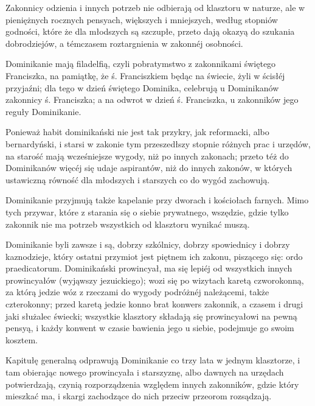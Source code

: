 \documentclass{book}
\begin{document}
Zakonnicy odzienia i innych potrzeb nie odbierają od klasztoru w naturze, ale w pieniężnych rocznych pensyach, większych i mniejszych, według stopniów godności, które że dla młodszych są szczupłe, przeto dają okazyą do szukania dobrodziejów, a témczasem roztargnienia w zakonnéj osobności.

Dominikanie mają filadelfią, czyli pobratymstwo z zakonnikami świętego Franciszka, na pamiątkę, że ś. Franciszkiem będąc na świecie, żyli w ścisłéj przyjaźni; dla tego w dzień świętego Dominika, celebrują u Dominikanów zakonnicy ś. Franciszka; a na odwrot w dzień ś. Franciszka, u zakonników jego reguły Dominikanie.

Ponieważ habit dominikański nie jest tak przykry, jak reformacki, albo bernardyński, i starsi w zakonie tym przeszedłszy stopnie różnych prac i urzędów, na starość mają wcześniejsze wygody, niż po innych zakonach; przeto téż do Dominikanów więcéj się udaje aspirantów, niż do innych zakonów, w których ustawiczną równość dla młodszych i starszych co do wygód zachowują.

Dominikanie przyjmują także kapelanie przy dworach i kościołach farnych. Mimo tych przywar, które z starania się o siebie prywatnego, wszędzie, gdzie tylko zakonnik nie ma potrzeb wszystkich od klasztoru wynikać muszą.

Dominikanie byli zawsze i są, dobrzy szkólnicy, dobrzy spowiednicy i dobrzy kaznodzieje, który ostatni przymiot jest piętnem ich zakonu, piszącego się: ordo praedicatorum. Dominikański prowincyał, ma się lepiéj od wszystkich innych prowincyałów (wyjąwszy jezuickiego); wozi się po wizytach karetą czworokonną, za którą jedzie wóz z rzeczami do wygody podróżnéj należącemi, także czterokonny; przed karetą jedzie konno brat konwers zakonnik, a czasem i drugi jaki służalec świecki; wszystkie klasztory składają się prowincyałowi na pewną pensyą, i każdy konwent w czasie bawienia jego u siebie, podejmuje go swoim kosztem.

Kapitułę generalną odprawują Dominikanie co trzy lata w jednym klasztorze, i tam obierając nowego prowincyała i starszyznę, albo dawnych na urzędach potwierdzają, czynią rozporządzenia względem innych zakonników, gdzie który mieszkać ma, i skargi zachodzące do nich przeciw przeorom rozsądzają.
\end{document}
